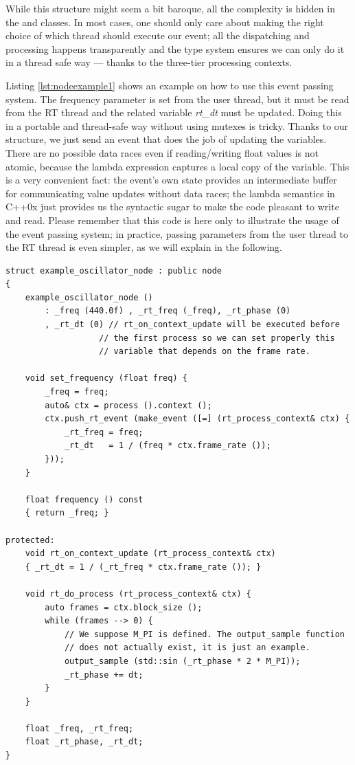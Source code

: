 While this structure might seem a bit baroque, all the complexity is
hidden in the  and 
classes. In most cases, one should only care about making the right
choice of which thread should execute our event; all the dispatching
and processing happens transparently and the type system ensures we
can only do it in a thread safe way --- thanks to the three-tier
processing contexts.

Listing \ref{lst:nodeexample1} shows an example on how to use this
event passing system. The frequency parameter is set from the user
thread, but it must be read from the RT thread and the related
variable \emph{rt\_dt} must be updated. Doing this in a portable and
thread-safe way without using mutexes is tricky. Thanks to our
structure, we just send an event that does the job of updating the
variables. There are no possible data races even if reading/writing
float values is not atomic, because the lambda expression captures a
local copy of the  variable. This is a very convenient
fact: the event's own state provides an intermediate buffer for
communicating value updates without data races; the lambda semantics
in C++0x just provides us the syntactic sugar to make the code
pleasant to write and read. Please remember that this code is here
only to illustrate the usage of the event passing system; in practice,
passing parameters from the user thread to the RT thread is even
simpler, as we will explain in the following.


\begin{lstlisting}[float=h!, label=lst:nodeexample1, caption=A thread communication use-case]
struct example_oscillator_node : public node
{
    example_oscillator_node ()
        : _freq (440.0f) , _rt_freq (_freq), _rt_phase (0)
        , _rt_dt (0) // rt_on_context_update will be executed before
                   // the first process so we can set properly this
                   // variable that depends on the frame rate.
    
    void set_frequency (float freq) {
        _freq = freq;
        auto& ctx = process ().context ();
        ctx.push_rt_event (make_event ([=] (rt_process_context& ctx) {
            _rt_freq = freq;
            _rt_dt   = 1 / (freq * ctx.frame_rate ());
        }));
    }

    float frequency () const
    { return _freq; }

protected:
    void rt_on_context_update (rt_process_context& ctx)
    { _rt_dt = 1 / (_rt_freq * ctx.frame_rate ()); }

    void rt_do_process (rt_process_context& ctx) {
        auto frames = ctx.block_size ();
        while (frames --> 0) {
            // We suppose M_PI is defined. The output_sample function
            // does not actually exist, it is just an example.
            output_sample (std::sin (_rt_phase * 2 * M_PI));
            _rt_phase += dt;
        }
    }

    float _freq, _rt_freq;
    float _rt_phase, _rt_dt;
}
\end{lstlisting}

